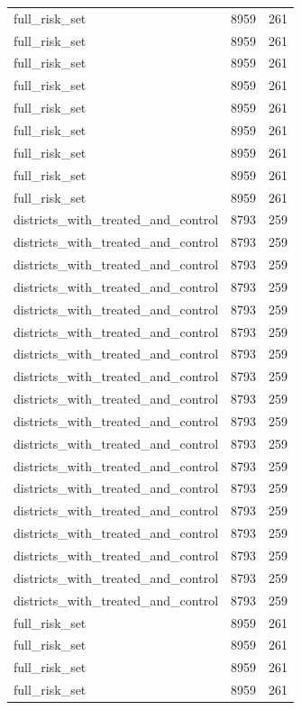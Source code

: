 \begin{table}[!htbp]
\begin{tabular}{lrr}
full\_risk\_set & 8959 & 261 \\
full\_risk\_set & 8959 & 261 \\
full\_risk\_set & 8959 & 261 \\
full\_risk\_set & 8959 & 261 \\
full\_risk\_set & 8959 & 261 \\
full\_risk\_set & 8959 & 261 \\
full\_risk\_set & 8959 & 261 \\
full\_risk\_set & 8959 & 261 \\
full\_risk\_set & 8959 & 261 \\
districts\_with\_treated\_and\_control & 8793 & 259 \\
districts\_with\_treated\_and\_control & 8793 & 259 \\
districts\_with\_treated\_and\_control & 8793 & 259 \\
districts\_with\_treated\_and\_control & 8793 & 259 \\
districts\_with\_treated\_and\_control & 8793 & 259 \\
districts\_with\_treated\_and\_control & 8793 & 259 \\
districts\_with\_treated\_and\_control & 8793 & 259 \\
districts\_with\_treated\_and\_control & 8793 & 259 \\
districts\_with\_treated\_and\_control & 8793 & 259 \\
districts\_with\_treated\_and\_control & 8793 & 259 \\
districts\_with\_treated\_and\_control & 8793 & 259 \\
districts\_with\_treated\_and\_control & 8793 & 259 \\
districts\_with\_treated\_and\_control & 8793 & 259 \\
districts\_with\_treated\_and\_control & 8793 & 259 \\
districts\_with\_treated\_and\_control & 8793 & 259 \\
districts\_with\_treated\_and\_control & 8793 & 259 \\
districts\_with\_treated\_and\_control & 8793 & 259 \\
districts\_with\_treated\_and\_control & 8793 & 259 \\
full\_risk\_set & 8959 & 261 \\
full\_risk\_set & 8959 & 261 \\
full\_risk\_set & 8959 & 261 \\
full\_risk\_set & 8959 & 261 \\

\end{tabular}
\end{table}
